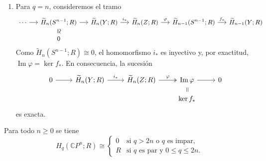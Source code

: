 \begin{dem}
\begin{enumerate}
    \item Para $q = n$, consideremos el tramo
    \[
    {\small
    \begin{tikzcd}[column sep=1.35em, row sep=1.0em]
    \cdots \arrow[r]
    & \widetilde{H}_n(S^{n-1}; R)
        \arrow[r]
        \arrow[d, phantom, "\cong"{description, sloped, inner sep=1pt}]
    & \widetilde{H}_n(Y; R) \arrow[r, "i_*"]
    & \widetilde{H}_n(Z; R) \arrow[r, "\varphi"]
    & \widetilde{H}_{n-1}(S^{n-1}; R) \arrow[r, "f_*"]
    & \widetilde{H}_{n-1}(Y; R) \\
    & 0 & & & &
    \end{tikzcd}}
    \]
    Como $\widetilde{H}_n(S^{n-1}; R) \cong 0$, el homomorfismo $i_*$ es inyectivo y, por exactitud, $\operatorname{Im}\varphi = \ker f_*$. En consecuencia, la sucesión
    \[
    \begin{tikzcd}[column sep=2.4em, row sep=1.0em]
    0 \arrow[r]
    & \widetilde{H}_n(Y; R) \arrow[r, "i_*"]
    & \widetilde{H}_n(Z; R) \arrow[r, two heads, "\varphi"]
    & \operatorname{Im}\varphi \arrow[r]
        \arrow[d, phantom, "="{description, sloped, inner sep=1pt}]
    & 0 \\
    & & & \ker f_* &
    \end{tikzcd}
    \]
    es exacta.
\end{enumerate}
\end{dem}

\begin{prop}
Para todo $n \geq 0$ se tiene
\[
H_q(\mathbb{C}P^n; R) \cong
\begin{cases}
0 & \text{si } q > 2n \text{ o } q \text{ es impar}, \\
R & \text{si } q \text{ es par y } 0 \leq q \leq 2n.
\end{cases}
\]
\end{prop}

